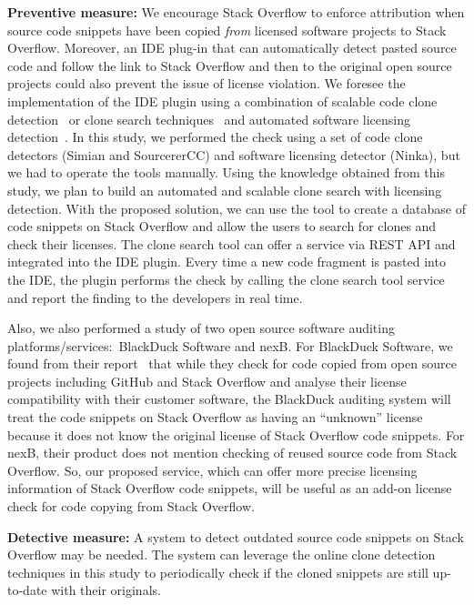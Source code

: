 \documentclass[10pt,journal,compsoc]{IEEEtran}
\begin{document}
\textbf{Preventive measure:} We encourage Stack Overflow to enforce attribution
when source code snippets have been copied \textit{from} licensed software projects
to Stack Overflow. Moreover, an IDE plug-in that can automatically detect pasted
source code and follow the link to Stack Overflow and then to the original open
source projects could also prevent the issue of license violation. We foresee
the implementation of the IDE plugin using a combination of scalable code clone
detection~\cite{Sajnani2016} or clone search techniques~\cite{Kim2018} and
automated software licensing detection~\cite{German2010}. In this study, we
performed the check using a set of code clone detectors (Simian and SourcererCC)
and software licensing detector (Ninka), but we had to operate the tools
manually. Using the knowledge obtained from this study, we plan to build an
automated and scalable clone search with licensing detection. With the proposed
solution, we can use the tool to create a database of code snippets on Stack
Overflow and allow the users to search for clones and check their licenses. The
clone search tool can offer a service via REST API and integrated into the IDE
plugin. Every time a new code fragment is pasted into the IDE, the plugin
performs the check by calling the clone search tool service and report the
finding to the developers in real time.

Also, we also performed a study of two open source software auditing
platforms/services:~BlackDuck
Software and nexB. For BlackDuck Software, we found from their
report~\cite{CORSI2017} that while they check for code copied from open source
projects including GitHub and Stack Overflow and analyse their license
compatibility with their customer software, the BlackDuck auditing system will
treat the code snippets on Stack Overflow as having an ``unknown'' license because
it does not know the original license of Stack Overflow code snippets. For nexB,
their product does not mention checking of reused source code from Stack
Overflow. So, our proposed service, which can offer more precise licensing
information of Stack Overflow code snippets, will be useful as an add-on license
check for code copying from Stack Overflow.
	
\textbf{Detective measure:} A
system to detect outdated source code snippets on Stack Overflow may be needed. The
system can leverage the online clone detection techniques in this study to
periodically check if the cloned snippets are still up-to-date with their
originals. 
\end{document}
